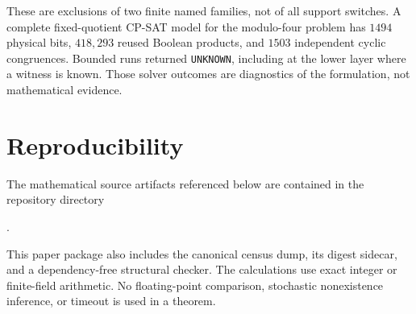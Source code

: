 \documentclass[11pt]{article}
\theoremstyle{definition}
\begin{document}
These are exclusions of two finite named families, not of all support
switches.  A complete fixed-quotient CP-SAT model for the modulo-four
problem has \(1494\) physical bits, \(418{,}293\) reused Boolean products,
and \(1503\) independent cyclic congruences.  Bounded runs returned
\texttt{UNKNOWN}, including at the lower layer where a witness is known.
Those solver outcomes are diagnostics of the formulation, not
mathematical evidence.

\section{Reproducibility}
\label{sec:reproducibility}

The mathematical source artifacts referenced below are contained in the
repository directory
\begin{center}
.
\end{center}
This paper package also includes the canonical census dump, its digest
sidecar, and a dependency-free structural checker.  The calculations use
exact integer or finite-field arithmetic.  No floating-point comparison,
stochastic nonexistence inference, or timeout is used in a theorem.
\end{document}
